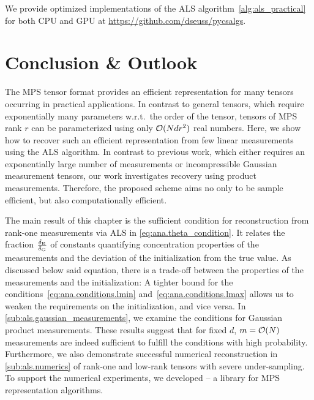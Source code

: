 We provide optimized implementations of the ALS algorithm~\ref{alg:als_practical} for both CPU and GPU at \url{https://github.com/dseuss/pycsalgs}.



\section{Conclusion \& Outlook}%
\label{sec:conclusion}

The MPS tensor format provides an efficient representation for many tensors occurring in practical applications.
In contrast to general tensors, which require exponentially many parameters w.r.t.\ the order of the tensor, tensors of MPS rank $r$ can be parameterized using only ${\mathcal{O}}(N d r^2)$ real numbers.
Here, we show how to recover such an efficient representation from few linear measurements using the ALS algorithm.
In contrast to previous work, which either requires an exponentially large number of measurements or incompressible Gaussian measurement tensors, our work investigates recovery using product measurements.
Therefore, the proposed scheme aims no only to be sample efficient, but also computationally efficient.

The main result of this chapter is the sufficient condition for reconstruction from rank-one measurements via ALS in \cref{eq:ana.theta_condition}.
It relates the fraction $\frac{\delta_\mathrm{B}}{\delta_\mathrm{G}}$ of constants quantifying concentration properties of the measurements and the deviation of the initialization from the true value.
As discussed below said equation, there is a trade-off between the properties of the measurements and the initialization:
A tighter bound for the conditions~\eqref{eq:ana.conditions.lmin} and~\eqref{eq:ana.conditions.lmax} allows us to weaken the requirements on the initialization, and vice versa.
In \cref{sub:als.gaussian_measurements}, we examine the conditions for Gaussian product measurements.
These results suggest that for fixed $d$, $m = {\mathcal{O}}(N)$ measurements are indeed sufficient to fulfill the conditions with high probability.
Furthermore, we also demonstrate successful numerical reconstruction in \cref{sub:als.numerics} of rank-one and low-rank tensors with severe under-sampling.
To support the numerical experiments, we developed \mpnum -- a library for MPS representation algorithms.\\



